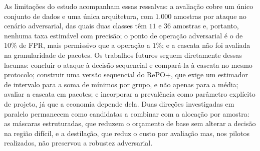 \documentclass[conference]{IEEEtran}
\begin{document}
As limitações do estudo acompanham essas ressalvas: a avaliação cobre um único conjunto de dados e uma única arquitetura, com $1.000$ amostras por ataque no cenário adversarial, das quais duas classes têm $11$ e $36$ amostras e, portanto, nenhuma taxa estimável com precisão; o ponto de operação adversarial é o de $10\%$ de FPR, mais permissivo que a operação a $1\%$; e a cascata não foi avaliada na granularidade de pacotes.
Os trabalhos futuros seguem diretamente dessas lacunas: concluir o ataque à decisão sequencial e compará-la à cascata no mesmo protocolo; construir uma versão sequencial do RePO+, que exige um estimador de intervalo para a soma de mínimos por grupo, e não apenas para a média; avaliar a cascata em pacotes; e incorporar a prevalência como parâmetro explícito de projeto, já que a economia depende dela.
Duas direções investigadas em paralelo permanecem como candidatas a combinar com a alocação por amostra: as máscaras estruturadas, que reduzem o orçamento de base sem alterar a decisão na região difícil, e a destilação, que reduz o custo por avaliação mas, nos pilotos realizados, não preservou a robustez adversarial.
\end{document}
